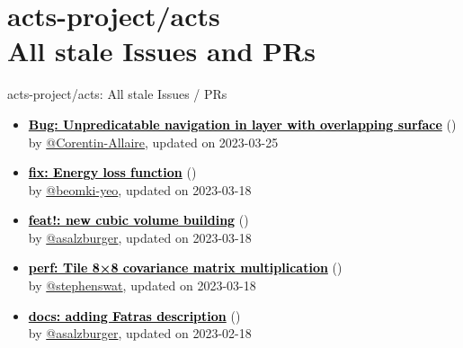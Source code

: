 \section{ acts-project/acts \\ All stale Issues and PRs}
\begin{frame}[allowframebreaks]{ acts-project/acts: All stale Issues / PRs}
  \begin{itemize}
    
    \item\iss\prstale\textbf{\href{https://github.com/acts-project/acts/issues/1852}{\textcolor{black}{Bug: Unpredicatable navigation in layer with overlapping surface}}}
    (\href{https://github.com/acts-project/acts/issues/1852}{}) \\
    by \href{https://github.com/Corentin-Allaire}{@Corentin-Allaire}, updated on 2023-03-25

    \item\propen\prstale\textbf{\href{https://github.com/acts-project/acts/pull/1323}{\textcolor{black}{fix: Energy loss function}}}
    (\href{https://github.com/acts-project/acts/pull/1323}{}) \\
    by \href{https://github.com/beomki-yeo}{@beomki-yeo}, updated on 2023-03-18

    \item\propen\prwip\prstale\textbf{\href{https://github.com/acts-project/acts/pull/1821}{\textcolor{black}{feat!: new cubic volume building}}}
    (\href{https://github.com/acts-project/acts/pull/1821}{}) \\
    by \href{https://github.com/asalzburger}{@asalzburger}, updated on 2023-03-18

    \item\propen\prstale\textbf{\href{https://github.com/acts-project/acts/pull/1181}{\textcolor{black}{perf: Tile 8×8 covariance matrix multiplication}}}
    (\href{https://github.com/acts-project/acts/pull/1181}{}) \\
    by \href{https://github.com/stephenswat}{@stephenswat}, updated on 2023-03-18

    \item\propen\prwip\prstale\textbf{\href{https://github.com/acts-project/acts/pull/1402}{\textcolor{black}{docs: adding Fatras description}}}
    (\href{https://github.com/acts-project/acts/pull/1402}{}) \\
    by \href{https://github.com/asalzburger}{@asalzburger}, updated on 2023-02-18


\end{itemize}
\end{frame}
